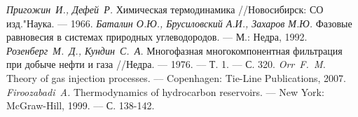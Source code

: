 \documentclass[12pt]{article}
\begin{document}
\begin{thebibliography}{9}
     {\em Пригожин~И., Дефей~Р.} Химическая термодинамика //Новосибирск: СО изд."Наука. --- 1966.
     {\em  Баталин О.Ю., Брусиловский А.И., Захаров М.Ю.} Фазовые равновесия в системах природных углеводородов. --- М.: Недра, 1992.
     {\em Розенберг~М.~Д., Кундин~С.~А.} Многофазная многокомпонентная фильтрация при добыче нефти и газа //Недра. --– 1976. --– Т. 1. --– С. 320.
     {\em Orr~F.~M.} Theory of gas injection processes. --– Copenhagen: Tie-Line Publications, 2007.
     {\em Firoozabadi~A.} Thermodynamics of hydrocarbon reservoirs. --– New York: McGraw-Hill, 1999. –-- С. 138-142.
\end{thebibliography}
\end{document}
